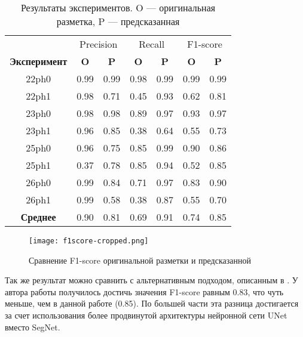 \begin{table}[ht]
	\centering
	\label{tab:results}
	\begin{tabular}{ccccccc} \toprule
		                     & \multicolumn{2}{c}{Precision} & \multicolumn{2}{c}{Recall} & \multicolumn{2}{c}{F1-score}                                        \\
		\textbf{Эксперимент} & \textbf{O}                    & \textbf{P}                 & \textbf{O}                   & \textbf{P} & \textbf{O} & \textbf{P} \\ \midrule
		22ph0 & 0.99 & 0.99 & 0.98 & 0.99 & 0.99 & 0.99 \\
		22ph1 & 0.98 & 0.71 & 0.45 & 0.93 & 0.62 & 0.81 \\
		23ph0 & 0.98 & 0.98 & 0.89 & 0.97 & 0.93 & 0.97 \\
		23ph1 & 0.96 & 0.85 & 0.38 & 0.64 & 0.55 & 0.73 \\
		25ph0 & 0.96 & 0.75 & 0.85 & 0.99 & 0.90 & 0.86 \\
		25ph1 & 0.37 & 0.78 & 0.85 & 0.94 & 0.52 & 0.85 \\
		26ph0 & 0.99 & 0.84 & 0.71 & 0.97 & 0.83 & 0.90 \\
		26ph1 & 0.99 & 0.58 & 0.38 & 0.87 & 0.55 & 0.70 \\ \midrule
		\textbf{Среднее} & 0.90 & 0.81 & 0.69 & 0.91 & 0.74 & 0.85 \\
		\bottomrule
	\end{tabular}
	\caption{\centering Результаты экспериментов. O --- оригинальная разметка, P --- предсказанная}
\end{table}

\begin{figure}[!htb]
	\centering
	\texttt{[image: f1score-cropped.png]}
	\caption{Сравнение F1-score оригинальной разметки и предсказанной}
	\label{fig:f1score-vs}
\end{figure}

Так же результат можно сравнить с альтернативным подходом, описанным в
\cite{anton}. У автора работы получилось достичь значения F1-score равным 0.83,
что чуть меньше, чем в данной работе (0.85). По большей части эта разница
достигается за счет использования более продвинутой архитектуры нейронной сети
UNet вместо SegNet.
